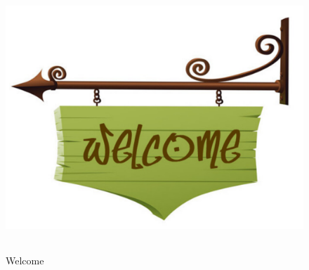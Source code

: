 \documentclass[11pt]{article}
\begin{document}
\newpage

\begin{figure}
\centering
\includegraphics[width=12cm, height=10cm]
{welcome}
\caption{Welcome}
\label{figure:2}
\end{figure}

\printindex



\end{document}
